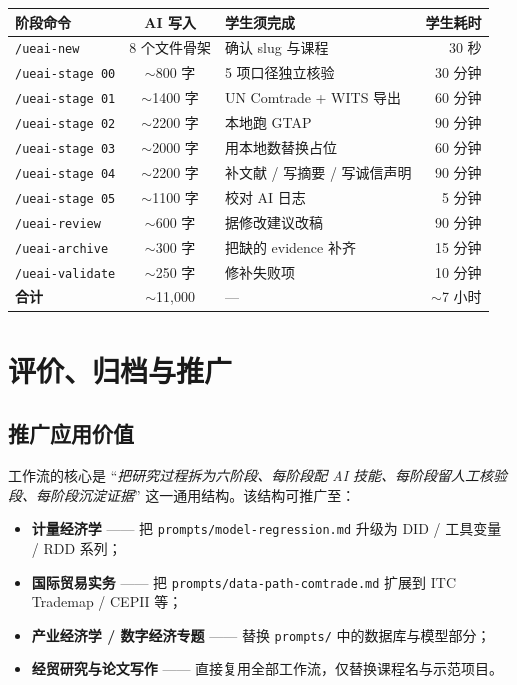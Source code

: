 \documentclass[12pt,a4paper]{article}
\begin{document}
\begin{center}
\small
\begin{tabularx}{\textwidth}{l c X r}
\toprule
\textbf{阶段命令} & \textbf{AI 写入} & \textbf{学生须完成} & \textbf{学生耗时} \\
\midrule
\texttt{/ueai-new}      & 8 个文件骨架    & 确认 slug 与课程        & 30 秒 \\
\texttt{/ueai-stage 00} & $\sim$800 字   & 5 项口径独立核验        & 30 分钟 \\
\texttt{/ueai-stage 01} & $\sim$1400 字  & UN Comtrade + WITS 导出 & 60 分钟 \\
\texttt{/ueai-stage 02} & $\sim$2200 字  & 本地跑 GTAP             & 90 分钟 \\
\texttt{/ueai-stage 03} & $\sim$2000 字  & 用本地数替换占位        & 60 分钟 \\
\texttt{/ueai-stage 04} & $\sim$2200 字  & 补文献 / 写摘要 / 写诚信声明 & 90 分钟 \\
\texttt{/ueai-stage 05} & $\sim$1100 字  & 校对 AI 日志            & 5 分钟 \\
\texttt{/ueai-review}   & $\sim$600 字   & 据修改建议改稿          & 90 分钟 \\
\texttt{/ueai-archive}  & $\sim$300 字   & 把缺的 evidence 补齐    & 15 分钟 \\
\texttt{/ueai-validate} & $\sim$250 字   & 修补失败项              & 10 分钟 \\
\midrule
\textbf{合计}            & $\sim$11{,}000 & ---                     & $\sim$7 小时 \\
\bottomrule
\end{tabularx}
\end{center}

\section{评价、归档与推广}

\subsection{推广应用价值}

工作流的核心是 ``\emph{把研究过程拆为六阶段、每阶段配 AI 技能、每阶段留人工核验段、每阶段沉淀证据}'' 这一通用结构。该结构可推广至：

\begin{itemize}[leftmargin=*]
  \item \textbf{计量经济学} —— 把 \texttt{prompts/model-regression.md} 升级为 DID / 工具变量 / RDD 系列；
  \item \textbf{国际贸易实务} —— 把 \texttt{prompts/data-path-comtrade.md} 扩展到 ITC Trademap / CEPII 等；
  \item \textbf{产业经济学 / 数字经济专题} —— 替换 \texttt{prompts/} 中的数据库与模型部分；
  \item \textbf{经贸研究与论文写作} —— 直接复用全部工作流，仅替换课程名与示范项目。
\end{itemize}
\end{document}
